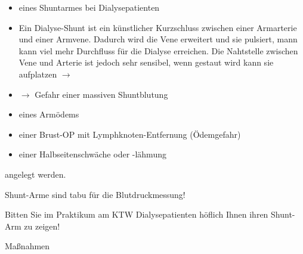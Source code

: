 \documentclass{article}
\begin{document}
\begin{itemize}
\item eines Shuntarmes bei Dialysepatienten

\end{itemize}
\begin{itemize}
\item Ein Dialyse-Shunt ist ein k\"unstlicher Kurzschluss zwischen einer
Armarterie und einer Armvene. Dadurch wird die Vene erweitert und sie
pulsiert, mann kann viel mehr Durchfluss f\"ur die Dialyse erreichen.
Die Nahtstelle zwischen Vene und Arterie ist jedoch sehr sensibel, wenn
gestaut wird kann sie aufplatzen ${\rightarrow}$ 

\item ${\rightarrow}$ Gefahr einer massiven Shuntblutung

\end{itemize}
\begin{itemize}
\item eines Arm\"odems

\item einer Brust-OP mit Lymphknoten-Entfernung (\"Odemgefahr)

\item einer Halbseitenschw\"ache oder -l\"ahmung 

\end{itemize}
angelegt werden. 

Shunt-Arme sind tabu f\"ur die Blutdruckmessung!

Bitten Sie im Praktikum am KTW Dialysepatienten h\"oflich Ihnen ihren
Shunt-Arm zu zeigen!

Ma{\ss}nahmen
\end{document}
